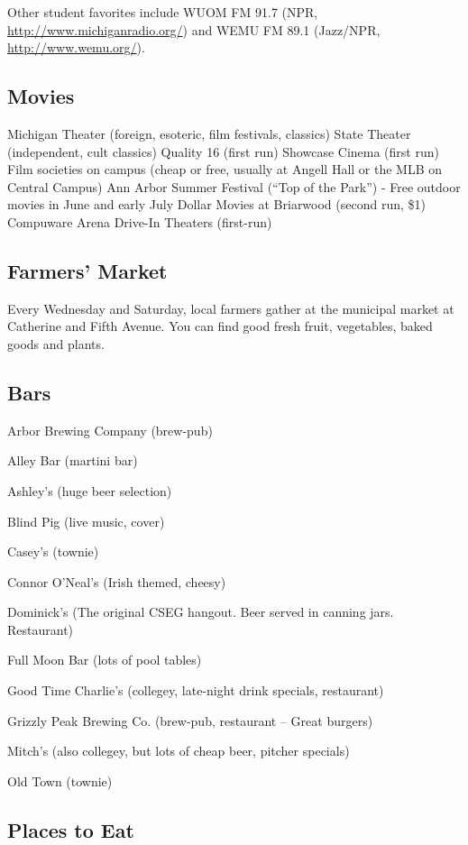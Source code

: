 \documentclass[11pt]{article}
\begin{document}
Other student favorites include WUOM FM 91.7 (NPR,
\href{http://www.michiganradio.org/}{http://www.michiganradio.org/}) and WEMU FM 89.1 (Jazz/NPR,
\href{http://www.wemu.org/}{http://www.wemu.org/}).
\subsection{Movies}
\label{sec-12_7}

Michigan Theater (foreign, esoteric, film festivals, classics)
State Theater (independent, cult classics)
Quality 16 (first run)
Showcase Cinema (first run)
Film societies on campus (cheap or free, usually at Angell Hall or the MLB on Central Campus)
Ann Arbor Summer Festival (“Top of the Park”) - Free outdoor movies in June and early July
Dollar Movies at Briarwood (second run, \$1)
Compuware Arena Drive-In Theaters (first-run)
\subsection{Farmers' Market}
\label{sec-12_8}

Every Wednesday and Saturday, local farmers gather at the municipal market at Catherine and Fifth Avenue.  You can find good fresh fruit, vegetables, baked goods and plants.
\subsection{Bars}
\label{sec-12_9}

Arbor Brewing Company (brew-pub)

Alley Bar (martini bar)

Ashley's (huge beer selection)

Blind Pig (live music, cover)

Casey’s (townie)

Connor O'Neal's (Irish themed, cheesy)

Dominick’s (The original CSEG hangout.  Beer served in canning jars.
Restaurant)

Full Moon Bar (lots of pool tables)

Good Time Charlie's (collegey, late-night drink specials, restaurant)

Grizzly Peak Brewing Co. (brew-pub, restaurant – Great burgers)

Mitch’s (also collegey, but lots of cheap beer, pitcher specials)

Old Town (townie)
\subsection{Places to Eat}
\label{sec-12_10}
\end{document}
